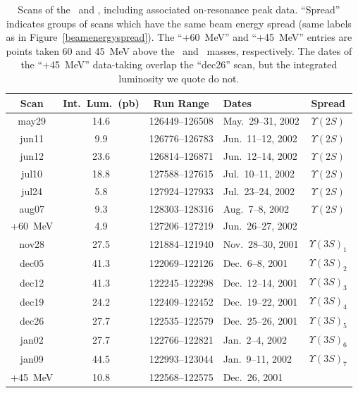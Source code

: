 \documentclass{cornell}
\begin{document}
\begin{table}
  \caption[Dates and integrated luminosity of \uss\ and \usss\
  scans]{\label{tab:scansb} Scans of the \uss\ and \usss, including
  associated on-resonance peak data.  ``Spread'' indicates groups of
  scans which have the same beam energy spread (same labels as in
  Figure~\ref{beamenergyspread}).  The ``+60~MeV'' and ``+45~MeV''
  entries are points taken 60 and 45~MeV above the \us\ and \usss\
  masses, respectively.  The dates of the ``+45~MeV'' data-taking
  overlap the ``dec26'' scan, but the integrated luminosity we quote
  do not.}
  \begin{center}
    \begin{tabular}{c c c l c}
    \hline\hline Scan & Int.\ Lum.\ (pb\inv) & Run Range & \hspace{0.75 cm} Dates & Spread \\\hline
     may29 & 14.6 & 126449--126508 & May.\ 29--31, \hfill 2002 & $\Upsilon(2S)$ \\
     jun11 & 9.9  & 126776--126783 & Jun.\ 11--12, \hfill 2002 & $\Upsilon(2S)$ \\
     jun12 & 23.6 & 126814--126871 & Jun.\ 12--14, \hfill 2002 & $\Upsilon(2S)$ \\
     jul10 & 18.8 & 127588--127615 & Jul.\ 10--11, \hfill 2002 & $\Upsilon(2S)$ \\
     jul24 & 5.8  & 127924--127933 & Jul.\ 23--24, \hfill 2002 & $\Upsilon(2S)$ \\
     aug07 & 9.3  & 128303--128316 & Aug.\  7--8, \hfill 2002 & $\Upsilon(2S)$ \\
   +60~MeV & 4.9  & 127206--127219 & Jun.\ 26--27, \hfill 2002 & \\\hline
     nov28 & 27.5 & 121884--121940 & Nov.\ 28--30, \hfill 2001 & $\Upsilon(3S)_1$ \\
     dec05 & 41.3 & 122069--122126 & Dec.\  6--8, \hfill 2001 & $\Upsilon(3S)_2$ \\
     dec12 & 41.3 & 122245--122298 & Dec.\ 12--14, \hfill 2001 & $\Upsilon(3S)_3$ \\
     dec19 & 24.2 & 122409--122452 & Dec.\ 19--22, \hfill 2001 & $\Upsilon(3S)_4$ \\
     dec26 & 27.7 & 122535--122579 & Dec.\ 25--26, \hfill 2001 & $\Upsilon(3S)_5$ \\
     jan02 & 27.7 & 122766--122821 & Jan.\  2--4, \hfill 2002 & $\Upsilon(3S)_6$ \\
     jan09 & 44.5 & 122993--123044 & Jan.\  9--11, \hfill 2002 & $\Upsilon(3S)_7$ \\
   +45~MeV & 10.8 & 122568--122575 & Dec.\ 26, \hfill 2001 & \\\hline\hline
    \end{tabular}
  \end{center}
\end{table}
\end{document}
